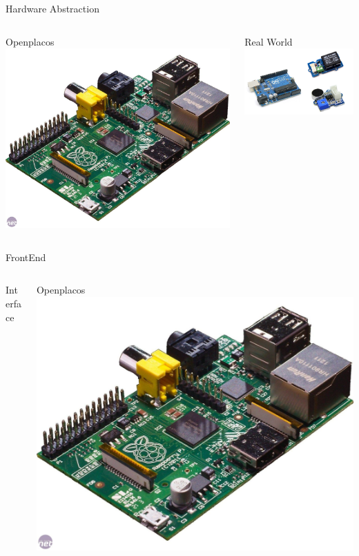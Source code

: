 \documentclass{beamer}
\begin{document}
\begin{frame}{Hardware Abstraction}
\begin{columns}
\begin{column}[l]{0.5\textwidth}
Openplacos \\
\includegraphics[width=0.3\columnwidth]{./figures/raspi.jpg}
\end{column}
\begin{column}[r]{0.5\textwidth}
Real World
\includegraphics[width=\columnwidth]{./figures/HWworld.png}
\end{column}
\end{columns}
\end{frame}

\begin{frame}{FrontEnd}
\begin{columns}
\begin{column}[l]{0.5\textwidth}
Interface
\end{column}
\begin{column}[r]{0.5\textwidth}
Openplacos \\
\includegraphics[width=0.3\columnwidth]{./figures/raspi.jpg}
\end{column}
\end{columns}
\end{frame}
\end{document}
